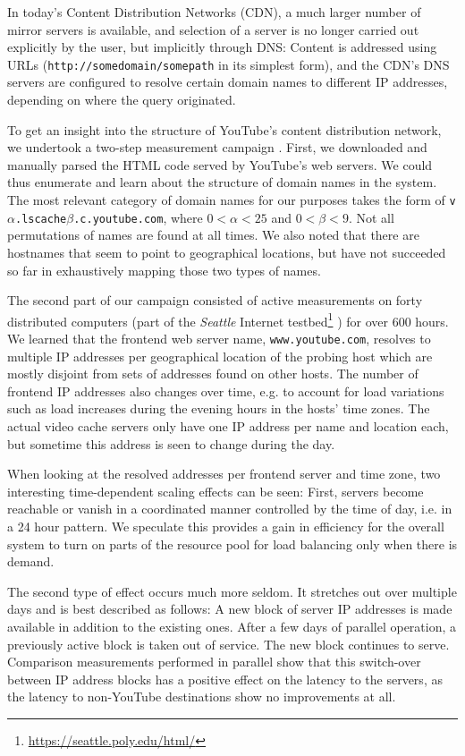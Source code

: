 In today's Content Distribution Networks (CDN), a much larger number of mirror servers is available, and selection of a server is no longer carried out explicitly by the user, but implicitly through DNS: Content is addressed using URLs (\texttt{http://somedomain/somepath} in its simplest form), and the CDN's DNS servers are configured to resolve certain domain names to different IP addresses, depending on where the query originated.

To get an insight into the structure of YouTube's content distribution network, we undertook a two-step measurement campaign \cite{rafetseder2011explyt}. First, we downloaded and manually parsed the HTML code served by YouTube's web servers. We could thus enumerate and learn about the structure of domain names in the system. The most relevant category of domain names for our purposes takes the form of \texttt{v$\alpha$.lscache$\beta$.c.youtube.com}, where $0<\alpha<25$ and $0<\beta<9$. Not all permutations of names are found at all times. We also noted that there are hostnames that seem to point to geographical locations, but have not succeeded so far in exhaustively mapping those two types of names.

The second part of our campaign consisted of active measurements on forty distributed computers (part of the \textit{Seattle} Internet testbed\footnote{\url{https://seattle.poly.edu/html/}} \cite{Cappos:2009:SPE:1508865.1508905}) for over 600 hours. We learned that the frontend web server name, \texttt{www.youtube.com}, resolves to multiple IP addresses per geographical location of the probing host which are mostly disjoint from sets of addresses found on other hosts. The number of frontend IP addresses also changes over time, e.g. to account for load variations such as load increases during the evening hours in the hosts' time zones. The actual video cache servers only have one IP address per name and location each, but sometime this address is seen to change during the day. 

When looking at the resolved addresses per frontend server and time zone, two interesting time-dependent scaling effects can be seen: First, servers become reachable or vanish in a coordinated manner controlled by the time of day, i.e. in a 24 hour pattern. We speculate this provides a gain in efficiency for the overall system to turn on parts of the resource pool for load balancing only when there is demand.

The second type of effect occurs much more seldom. It stretches out over multiple days and is best described as follows: A new block of server IP addresses is made available in addition to the existing ones. After a few days of parallel operation, a previously active block is taken out of service. The new block continues to serve. Comparison measurements  performed in parallel show that this switch-over between IP address blocks has a positive effect on the latency to the servers, as the latency to non-YouTube destinations show no improvements at all.





